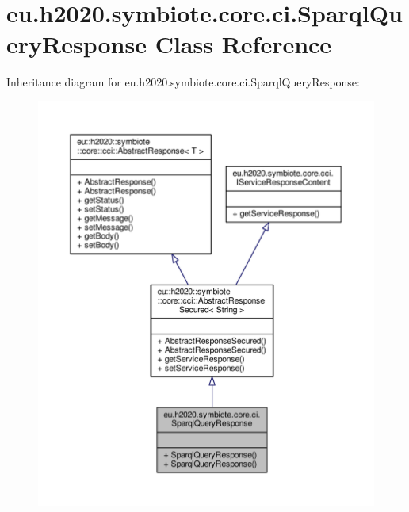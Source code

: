\hypertarget{classeu_1_1h2020_1_1symbiote_1_1core_1_1ci_1_1SparqlQueryResponse}{}\section{eu.\+h2020.\+symbiote.\+core.\+ci.\+Sparql\+Query\+Response Class Reference}
\label{classeu_1_1h2020_1_1symbiote_1_1core_1_1ci_1_1SparqlQueryResponse}


Inheritance diagram for eu.\+h2020.\+symbiote.\+core.\+ci.\+Sparql\+Query\+Response\+:
\nopagebreak
\begin{figure}[H]
\begin{center}
\leavevmode
\includegraphics[width=350pt]{classeu_1_1h2020_1_1symbiote_1_1core_1_1ci_1_1SparqlQueryResponse__inherit__graph}
\end{center}
\end{figure}


